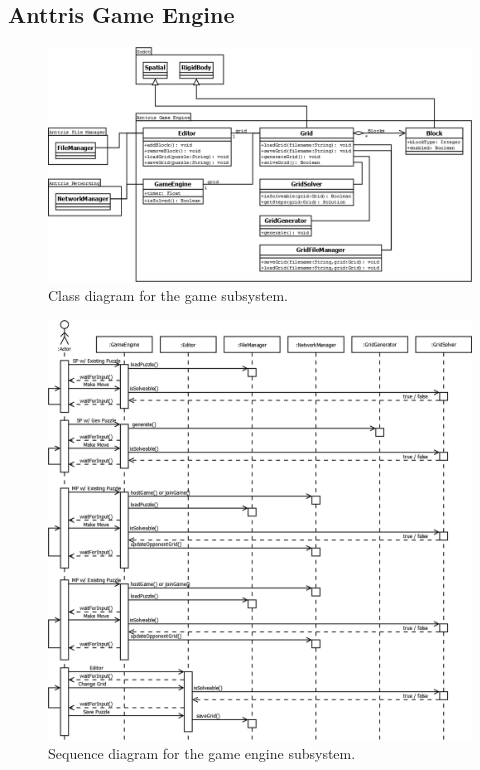 \documentclass[12pt]{article}
\begin{document}
\subsection{Anttris Game Engine} %
    \begin{figure}[H]
        \centering
        \includegraphics[width=6in]{Anttris_GameClass.png}
        \caption{Class diagram for the game subsystem.}
    \end{figure}
	\begin{figure}[H]
        \centering
        \includegraphics[width=6in]{Anttris_GameSequence.png}
        \caption{Sequence diagram for the game engine subsystem.}
    \end{figure}
\end{document}
